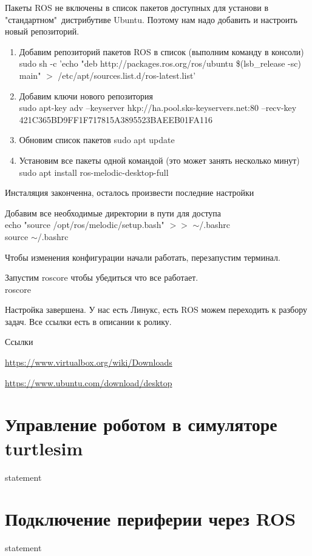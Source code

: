 Пакеты ROS не включены в список пакетов доступных для установи в "стандартном"\ дистрибутиве Ubuntu. Поэтому нам надо добавить и настроить новый репозиторий.
\begin{enumerate}
    \item Добавим репозиторий пакетов ROS в список (выполним команду в консоли)\\
    sudo sh -c 'echo "deb http://packages.ros.org/ros/ubuntu \$(lsb\_release -sc) main" $>$ /etc/apt/sources.list.d/ros-latest.list'
    \item Добавим ключи нового репозитория\\
    sudo apt-key adv --keyserver hkp://ha.pool.sks-keyservers.net:80 --recv-key \\ 421C365BD9FF1F717815A3895523BAEEB01FA116
    \item Обновим список пакетов
    sudo apt update
    \item Установим все пакеты одной командой (это может занять несколько минут)\\
    sudo apt install ros-melodic-desktop-full
\end{enumerate}

Инсталяция законченна, осталось произвести последние настройки

Добавим все необходимые директории в пути для доступа\\
echo "source /opt/ros/melodic/setup.bash" $>>$ $\sim$/.bashrc\\
source $\sim$/.bashrc

Чтобы изменения конфигурации начали работать, перезапустим терминал.

Запустим roscore чтобы убедиться что все работает.\\
roscore

Настройка завершена. У нас есть Линукс, есть ROS можем переходить к разбору задач.
Все ссылки есть в описании к ролику.

Ссылки

\url{https://www.virtualbox.org/wiki/Downloads}

\url{https://www.ubuntu.com/download/desktop}

\section{Управление роботом в симуляторе turtlesim}

{statement}

\section{Подключение периферии через ROS}

{statement}